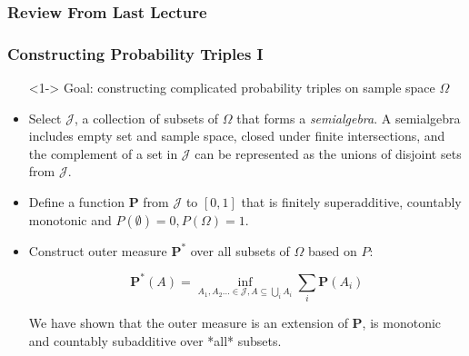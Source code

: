 \documentclass[handout]{beamer}
\newcommand{\BP}{\mathbf{P}}
\begin{document}
\subsubsection{Review From Last Lecture }
\frame
{
  \frametitle{Constructing Probability Triples I }

   \begin{itemize}

      
       \item[] <1->  Goal:  constructing complicated probability triples on sample space $\Omega$
       
              \item <1->[1)]  Select $\mathcal{J}$, a collection of subsets of $\Omega$ that forms a \textit{semialgebra}. A semialgebra includes empty set and sample space, closed under finite intersections, and the complement of a set in $\mathcal{J}$ can be represented as the unions of disjoint sets from $\mathcal{J}$.
               \item <1->[2)]  Define a function $\mathbf{P}$ from $\mathcal{J}$ to $[0,1]$ that is finitely superadditive, countably monotonic and $P(\emptyset)=0, P(\Omega)=1$.
               \item <2-> [3)]   Construct outer measure $\BP^*$ over all subsets of $\Omega$ based on $P$:
               
    $$\BP^*(A)=\inf_{A_1,A_2\ldots \in \mathcal{J}, A\subseteq \bigcup_i A_i} \sum_i \BP(A_i) $$

               We have shown that the outer measure is an extension of $\mathbf{P}$, is monotonic and countably subadditive over *all* subsets.
               
              
                 \end{itemize}
}
\end{document}
